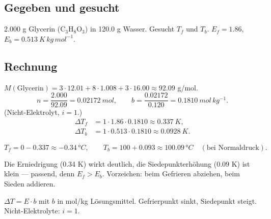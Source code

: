 
\subsection*{Gegeben und gesucht}
2.000 g Glycerin (C$_3$H$_8$O$_3$) in 120.0 g Wasser. Gesucht $T_f$ und
$T_b$. $E_f=1.86$, $E_b=0.513\ K\,kg\,mol^{-1}$.

\subsection*{Rechnung}
$M(\text{Glycerin}) = 3\cdot12.01+8\cdot1.008+3\cdot16.00 \approx 92.09$
g/mol.
\[
  n = \frac{2.000}{92.09} = 0.02172\ mol,\qquad
  b = \frac{0.02172}{0.120} = 0.1810\ mol\,kg^{-1}.
\]
(Nicht-Elektrolyt, $i=1$.)
\begin{align*}
  \Delta T_f &= 1\cdot1.86\cdot0.1810 \approx 0.337\ K,\\
  \Delta T_b &= 1\cdot0.513\cdot0.1810 \approx 0.0928\ K.
\end{align*}

\begin{ergebnis}
\[
  T_f = 0 - 0.337 \approx -0.34\,°C,\qquad
  T_b = 100 + 0.093 \approx 100.09\,°C
  \quad(\text{bei Normaldruck}).
\]
\end{ergebnis}

\begin{kontrolle}
Die Erniedrigung (0.34 K) wirkt deutlich, die Siedepunkterhöhung
(0.09 K) ist klein --- passend, denn $E_f > E_b$. Vorzeichen: beim
Gefrieren abziehen, beim Sieden addieren.
\end{kontrolle}

\begin{merksatz}
$\Delta T = E\cdot b$ mit $b$ in mol/kg Lösungsmittel. Gefrierpunkt sinkt,
Siedepunkt steigt. Nicht-Elektrolyte: $i=1$.
\end{merksatz}

